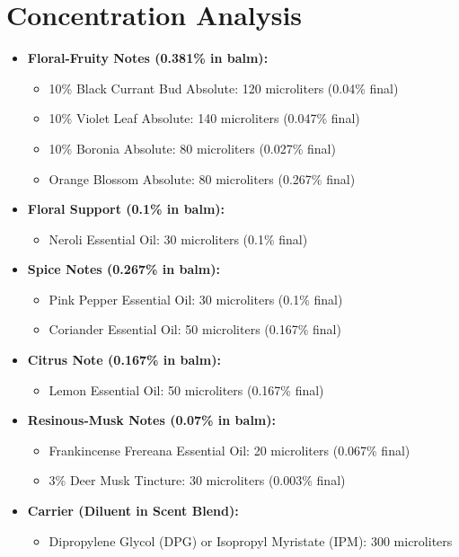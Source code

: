 \documentclass{article}
\begin{document}
\vspace{0.5cm}

\section*{Concentration Analysis}
\begin{itemize}[leftmargin=*]
  \item \textcolor{colaRed}{\textbf{Floral-Fruity Notes (0.381\% in balm):}}
  \begin{itemize}
    \item 10\% Black Currant Bud Absolute: 120 microliters (0.04\% final)
    \item 10\% Violet Leaf Absolute: 140 microliters (0.047\% final)
    \item 10\% Boronia Absolute: 80 microliters (0.027\% final)
    \item Orange Blossom Absolute: 80 microliters (0.267\% final)
  \end{itemize}
  
  \item \textcolor{colaRed}{\textbf{Floral Support (0.1\% in balm):}}
  \begin{itemize}
    \item Neroli Essential Oil: 30 microliters (0.1\% final)
  \end{itemize}
  
  \item \textcolor{colaRed}{\textbf{Spice Notes (0.267\% in balm):}}
  \begin{itemize}
    \item Pink Pepper Essential Oil: 30 microliters (0.1\% final)
    \item Coriander Essential Oil: 50 microliters (0.167\% final)
  \end{itemize}
  
  \item \textcolor{violetPurple}{\textbf{Citrus Note (0.167\% in balm):}}
  \begin{itemize}
    \item Lemon Essential Oil: 50 microliters (0.167\% final)
  \end{itemize}
  
  \item \textcolor{violetPurple}{\textbf{Resinous-Musk Notes (0.07\% in balm):}}
  \begin{itemize}
    \item Frankincense Frereana Essential Oil: 20 microliters (0.067\% final)
    \item 3\% Deer Musk Tincture: 30 microliters (0.003\% final)
  \end{itemize}
  
  \item \textcolor{colaBrown}{\textbf{Carrier (Diluent in Scent Blend):}}
  \begin{itemize}
    \item Dipropylene Glycol (DPG) or Isopropyl Myristate (IPM): 300 microliters
  \end{itemize}
\end{itemize}
\end{document}
